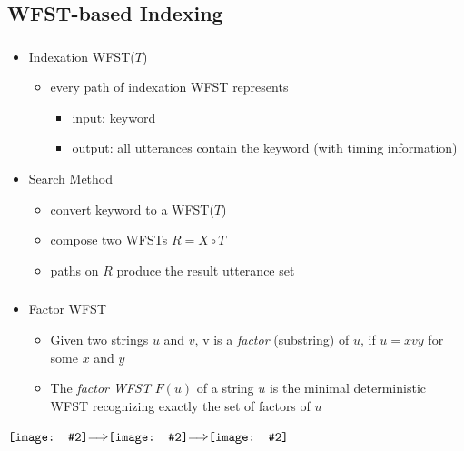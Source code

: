 \documentclass{beamer}
\newcommand*{\vcenterimage}[2][]{\vcenter{\hbox{\texttt{[image: \#2]}}}}
\newcommand*{\vcenterarrow}{\vcenter{\hbox{$\Longrightarrow$}}}
\begin{document}
\subsection{WFST-based Indexing}
\frame
{
  \frametitle{\subsecname}
  
  \begin{itemize}
  \item<1->{Indexation WFST($T$)}
    \begin{itemize}
    \item{every path of indexation WFST represents}
      \begin{itemize}
      \item{input: keyword}
      \item{output: all utterances contain the keyword (with timing information)}
      \end{itemize}
    \end{itemize}
 
  \item<2->{Search Method}
    \begin{itemize}
    \item{convert keyword to a WFST($T$)}
    \item{compose two WFSTs $R = X \circ T$}
    \item{paths on $R$ produce the result utterance set}
    \end{itemize}
  \end{itemize}
}

\frame
{
  \frametitle{\subsecname}
  
  \begin{itemize}
  \item{Factor WFST}
    \begin{itemize}
    \item{Given two strings $u$ and $v$, v is a \emph{factor} (substring) of $u$, if $u = xvy$ for some $x$ and $y$}
    \item{The \emph{factor WFST} $F(u)$ of a string $u$ is the minimal deterministic WFST recognizing exactly the set of factors of $u$}
    \end{itemize}
  \end{itemize}
  
  $\vcenterimage[width=.3\textwidth]{wfst.png}\vcenterarrow\vcenterimage[width=.3\textwidth]{factor.png}\vcenterarrow\vcenterimage[width=.3\textwidth]{opt_factor.png}$
}
\end{document}
